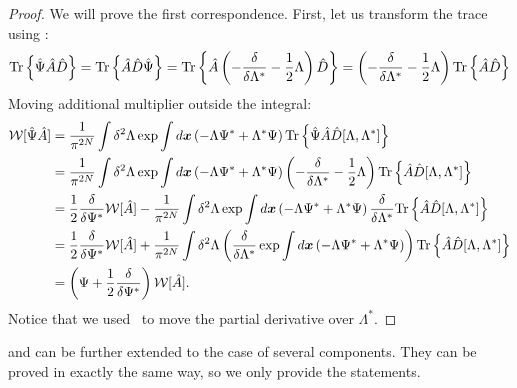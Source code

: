 \begin{proof}
We will prove the first correspondence.
First, let us transform the trace using :
\begin{equation*}
\begin{split}
	\mathrm{Tr} \left\{  \hat{\Psi} \hat{A} \hat{D}  \right\}
	= \mathrm{Tr} \left\{  \hat{A} \hat{D} \hat{\Psi} \right\}
	= \mathrm{Tr} \left\{  \hat{A} \left(
		-\frac{\delta}{\delta \Lambda^*}
		-\frac{1}{2} \Lambda
	\right) \hat{D} \right\}
	= \left(
		-\frac{\delta}{\delta \Lambda^*}
		-\frac{1}{2} \Lambda
	\right) \mathrm{Tr} \left\{  \hat{A} \hat{D} \right\}
\end{split}
\end{equation*}
Moving additional multiplier outside the integral:
\begin{equation*}
\begin{split}
	\mathcal{W} [ \hat{\Psi} \hat{A} ]
	& = \frac{1}{\pi^{2N}} \int \delta^2 \Lambda
		\exp \int d\boldsymbol{x} \left( -\Lambda \Psi^* + \Lambda^* \Psi \right)
		\mathrm{Tr} \left\{  \hat{\Psi} \hat{A} \hat{D}[\Lambda, \Lambda^*]  \right\} \\
	& = \frac{1}{\pi^{2N}} \int \delta^2 \Lambda
		\exp \int d\boldsymbol{x} \left( -\Lambda \Psi^* + \Lambda^* \Psi \right)
		\left(
			-\frac{\delta}{\delta \Lambda^*}
			-\frac{1}{2} \Lambda
		\right)
		\mathrm{Tr} \left\{  \hat{A} \hat{D}[\Lambda, \Lambda^*]  \right\} \\
	& = \frac{1}{2} \frac{\delta}{\delta \Psi^*} \mathcal{W} [\hat{A}]
	- \frac{1}{\pi^{2N}} \int \delta^2 \Lambda
		\exp \int d\boldsymbol{x} \left( -\Lambda \Psi^* + \Lambda^* \Psi \right)
		\frac{\delta}{\delta \Lambda^*}
		\mathrm{Tr} \left\{  \hat{A} \hat{D}[\Lambda, \Lambda^*]  \right\} \\
	& = \frac{1}{2} \frac{\delta}{\delta \Psi^*} \mathcal{W} [\hat{A}]
	+ \frac{1}{\pi^{2N}} \int \delta^2 \Lambda \left(
		\frac{\delta}{\delta \Lambda^*}
		\exp \int d\boldsymbol{x} \left( -\Lambda \Psi^* + \Lambda^* \Psi \right)
	\right)
	\mathrm{Tr} \left\{  \hat{A} \hat{D}[\Lambda, \Lambda^*]  \right\} \\
	& = \left( \Psi + \frac{1}{2} \frac{\delta}{\delta \Psi^*} \right) \mathcal{W} [\hat{A}].
\end{split}
\end{equation*}
Notice that we used~ to move the partial derivative over $\Lambda^*$.
\end{proof}

 and  can be further extended to the case of several components.
They can be proved in exactly the same way, so we only provide the statements.

